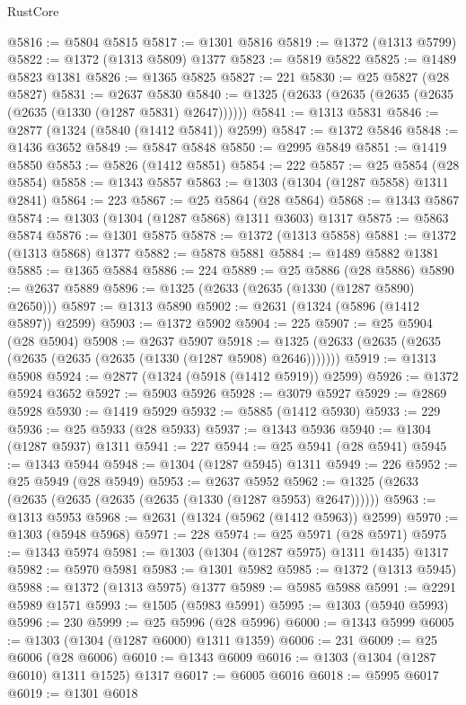 \begin{lexlean}{RustCore}
\begin{coremodule}
@5816 := @5804 @5815
@5817 := @1301 @5816
@5819 := @1372 (@1313 @5799)
@5822 := @1372 (@1313 @5809) @1377
@5823 := @5819 @5822
@5825 := @1489 @5823 @1381
@5826 := @1365 @5825
@5827 := 221
@5830 := @25 @5827 (@28 @5827)
@5831 := @2637 @5830
@5840 := @1325 (@2633 (@2635 (@2635 (@2635 (@2635 (@1330 (@1287 @5831) @2647))))))
@5841 := @1313 @5831
@5846 := @2877 (@1324 (@5840 (@1412 @5841)) @2599)
@5847 := @1372 @5846
@5848 := @1436 @3652
@5849 := @5847 @5848
@5850 := @2995 @5849
@5851 := @1419 @5850
@5853 := @5826 (@1412 @5851)
@5854 := 222
@5857 := @25 @5854 (@28 @5854)
@5858 := @1343 @5857
@5863 := @1303 (@1304 (@1287 @5858) @1311 @2841)
@5864 := 223
@5867 := @25 @5864 (@28 @5864)
@5868 := @1343 @5867
@5874 := @1303 (@1304 (@1287 @5868) @1311 @3603) @1317
@5875 := @5863 @5874
@5876 := @1301 @5875
@5878 := @1372 (@1313 @5858)
@5881 := @1372 (@1313 @5868) @1377
@5882 := @5878 @5881
@5884 := @1489 @5882 @1381
@5885 := @1365 @5884
@5886 := 224
@5889 := @25 @5886 (@28 @5886)
@5890 := @2637 @5889
@5896 := @1325 (@2633 (@2635 (@1330 (@1287 @5890) @2650)))
@5897 := @1313 @5890
@5902 := @2631 (@1324 (@5896 (@1412 @5897)) @2599)
@5903 := @1372 @5902
@5904 := 225
@5907 := @25 @5904 (@28 @5904)
@5908 := @2637 @5907
@5918 := @1325 (@2633 (@2635 (@2635 (@2635 (@2635 (@2635 (@1330 (@1287 @5908) @2646)))))))
@5919 := @1313 @5908
@5924 := @2877 (@1324 (@5918 (@1412 @5919)) @2599)
@5926 := @1372 @5924 @3652
@5927 := @5903 @5926
@5928 := @3079 @5927
@5929 := @2869 @5928
@5930 := @1419 @5929
@5932 := @5885 (@1412 @5930)
@5933 := 229
@5936 := @25 @5933 (@28 @5933)
@5937 := @1343 @5936
@5940 := @1304 (@1287 @5937) @1311
@5941 := 227
@5944 := @25 @5941 (@28 @5941)
@5945 := @1343 @5944
@5948 := @1304 (@1287 @5945) @1311
@5949 := 226
@5952 := @25 @5949 (@28 @5949)
@5953 := @2637 @5952
@5962 := @1325 (@2633 (@2635 (@2635 (@2635 (@2635 (@1330 (@1287 @5953) @2647))))))
@5963 := @1313 @5953
@5968 := @2631 (@1324 (@5962 (@1412 @5963)) @2599)
@5970 := @1303 (@5948 @5968)
@5971 := 228
@5974 := @25 @5971 (@28 @5971)
@5975 := @1343 @5974
@5981 := @1303 (@1304 (@1287 @5975) @1311 @1435) @1317
@5982 := @5970 @5981
@5983 := @1301 @5982
@5985 := @1372 (@1313 @5945)
@5988 := @1372 (@1313 @5975) @1377
@5989 := @5985 @5988
@5991 := @2291 @5989 @1571
@5993 := @1505 (@5983 @5991)
@5995 := @1303 (@5940 @5993)
@5996 := 230
@5999 := @25 @5996 (@28 @5996)
@6000 := @1343 @5999
@6005 := @1303 (@1304 (@1287 @6000) @1311 @1359)
@6006 := 231
@6009 := @25 @6006 (@28 @6006)
@6010 := @1343 @6009
@6016 := @1303 (@1304 (@1287 @6010) @1311 @1525) @1317
@6017 := @6005 @6016
@6018 := @5995 @6017
@6019 := @1301 @6018

\end{coremodule}
\end{lexlean}
